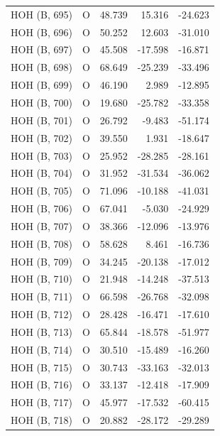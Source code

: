 \begin{longtable}{@{}lcrr@{}}
  \cmidrule(r){1-5}
  HOH (B, 695) & O & 48.739 & 15.316 & -24.623 \\
  \cmidrule(r){1-5}
  HOH (B, 696) & O & 50.252 & 12.603 & -31.010 \\
  \cmidrule(r){1-5}
  HOH (B, 697) & O & 45.508 & -17.598 & -16.871 \\
  \cmidrule(r){1-5}
  HOH (B, 698) & O & 68.649 & -25.239 & -33.496 \\
  \cmidrule(r){1-5}
  HOH (B, 699) & O & 46.190 & 2.989 & -12.895 \\
  \cmidrule(r){1-5}
  HOH (B, 700) & O & 19.680 & -25.782 & -33.358 \\
  \cmidrule(r){1-5}
  HOH (B, 701) & O & 26.792 & -9.483 & -51.174 \\
  \cmidrule(r){1-5}
  HOH (B, 702) & O & 39.550 & 1.931 & -18.647 \\
  \cmidrule(r){1-5}
  HOH (B, 703) & O & 25.952 & -28.285 & -28.161 \\
  \cmidrule(r){1-5}
  HOH (B, 704) & O & 31.952 & -31.534 & -36.062 \\
  \cmidrule(r){1-5}
  HOH (B, 705) & O & 71.096 & -10.188 & -41.031 \\
  \cmidrule(r){1-5}
  HOH (B, 706) & O & 67.041 & -5.030 & -24.929 \\
  \cmidrule(r){1-5}
  HOH (B, 707) & O & 38.366 & -12.096 & -13.976 \\
  \cmidrule(r){1-5}
  HOH (B, 708) & O & 58.628 & 8.461 & -16.736 \\
  \cmidrule(r){1-5}
  HOH (B, 709) & O & 34.245 & -20.138 & -17.012 \\
  \cmidrule(r){1-5}
  HOH (B, 710) & O & 21.948 & -14.248 & -37.513 \\
  \cmidrule(r){1-5}
  HOH (B, 711) & O & 66.598 & -26.768 & -32.098 \\
  \cmidrule(r){1-5}
  HOH (B, 712) & O & 28.428 & -16.471 & -17.610 \\
  \cmidrule(r){1-5}
  HOH (B, 713) & O & 65.844 & -18.578 & -51.977 \\
  \cmidrule(r){1-5}
  HOH (B, 714) & O & 30.510 & -15.489 & -16.260 \\
  \cmidrule(r){1-5}
  HOH (B, 715) & O & 30.743 & -33.163 & -32.013 \\
  \cmidrule(r){1-5}
  HOH (B, 716) & O & 33.137 & -12.418 & -17.909 \\
  \cmidrule(r){1-5}
  HOH (B, 717) & O & 45.977 & -17.532 & -60.415 \\
  \cmidrule(r){1-5}
  HOH (B, 718) & O & 20.882 & -28.172 & -29.289 \\

\end{longtable}
